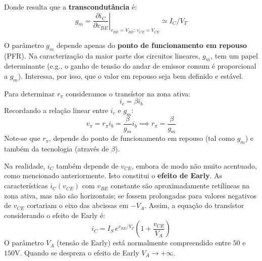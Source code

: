 \renewcommand*{\thefootnote}{\fnsymbol{footnote}}
\renewcommand*{\thefootnote}{\arabic{footnote}}

\noindent Donde resulta que a \textbf{transcondutância} é:
$$
    \boxed{g_m = \left.\frac{\partial i_C}{\partial v_\textit{BE}}\right|_{v_\textit{BE} = V_\textit{BE};\, v_\textit{CE} = V_\textit{CE}} \simeq I_C/V_T}
$$

\noindent O parâmetro $g_m$ depende apenas do \textbf{ponto de funcionamento em repouso} (PFR). Na caracterização da maior parte dos circuitos lineares, $g_m$, tem um papel determinante (e.g., o ganho de tensão do andar de emissor comum é proporcional a $g_m$). Interessa, por isso, que o valor em repouso seja bem definido e estável.

\begin{mdframed}
    \noindent Para determinar $r_\pi$ consideramos o transístor na zona ativa:
    $$
        i_c = \beta i_b
    $$
    \noindent Recordando a relação linear entre $i_c$ e $g_m$:
    $$
        v_{\pi} = r_\pi i_b = \frac{\beta}{g_m} i_b \implies \boxed{r_\pi = \frac{\beta}{g_m}}
    $$
    \noindent Note-se que $r_\pi$, depende do ponto de funcionamento em repouso (tal como $g_m$) e também da tecnologia (através de $\beta$).
\end{mdframed}

\noindent Na realidade, $i_C$ também depende de $v_\textit{CE}$, embora de modo não muito acentuado, como mencionado anteriormente. Isto constitui o \textbf{efeito de Early}. As características $i_C(v_\textit{CE})$ com $v_{BE}$ constante são aproximadamente retilíneas na zona ativa, mas não são horizontais; se fossem prolongadas para valores negativos de $v_\textit{CE}$ cortariam o eixo das abcissas em $-V_A$. Assim, a equação do transístor considerando o efeito de Early é:
$$
    \boxed{i_C = I_S\, e^{v_{BE}/V_T} \left(1 + \frac{v_{CE}}{V_A}\right)}
$$
O parâmetro $V_A$ (tensão de Early) está normalmente compreendido entre $50$ e $150$V. Quando se despreza o efeito de Early $V_A \to +\infty$.

